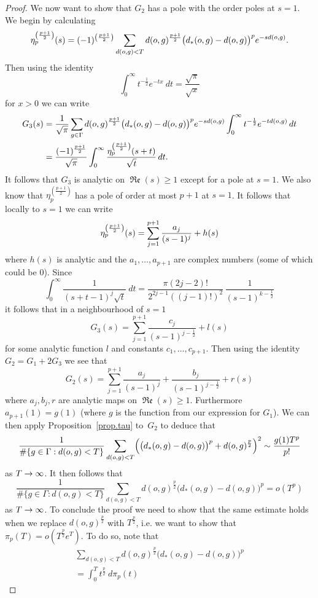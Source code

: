 \documentclass[10pt]{amsart}
\theoremstyle{definition}\newtheorem{defi}[theo]{Definition}\newtheorem{rema}[theo]{Remark}\newtheorem{exam}[theo]{Example}\newtheorem{exem}[theo]{Example}\newtheorem{nota}[theo]{Notation}
\newcommand{\G}{\Gamma}
\DeclareMathOperator{\fkRe}{\mathfrak{Re}}
\let\originalleft\left
\let\originalright\right
\renewcommand{\left}{\mathopen{}\mathclose\bgroup\originalleft}
\renewcommand{\right}{\aftergroup\egroup\originalright}
\renewcommand*{\to}{\mathchoice{\longrightarrow}{\rightarrow}{\rightarrow}{\rightarrow}}
\theoremstyle{plain}
\begin{document}
\begin{proof}
We now want to show that $G_2$ has a pole with the order poles at $s=1$. We begin by calculating
\[
\eta_p^{\left(\frac{p+1}{2}\right)}(s) = (-1)^{\left(\frac{p+1}{2}\right)} \sum_{d(o,g) <T} d(o,g)^{ \frac{p+1}{2}}\bigl(d_\ast(o,g) - d(o,g)\bigr)^p e^{-sd(o,g)}.
\]
Then using the identity
\[
\int_0^\infty t^{-\frac{1}{2}} e^{-tx} \ dt = \frac{\sqrt{\pi}}{\sqrt{x}}
\]
for $x >0$ we can write
\begin{align*}
G_3(s) &= \frac{1}{\sqrt{\pi}} \sum_{g\in\G} d(o,g)^{\frac{p+1}{2}} \bigl(d_\ast(o,g) - d(o,g)\bigr)^p e^{-sd(o,g)} \int_0^\infty t^{-\frac{1}{2}} e^{-td(o,g)} \, dt\\
&= \frac{(-1)^{\frac{p+1}{2}}}{\sqrt{\pi}} \int_0^\infty \frac{\eta_p^{\left(\frac{p+1}{2}\right)}(s+t) }{\sqrt{t}} \, dt.
\end{align*}
It follows that $G_3$ is analytic on $\fkRe(s) \ge 1$ except for a pole at $s=1$. We also know that $\eta_p^{(\frac{p+1}{2})}$ has a pole of order at most $p+1$ at $s=1$. It follows that locally to $s=1$ we can write
\[
\eta_p^{\left(\frac{p+1}{2}\right)}(s) = \sum_{j=1}^{p+1} \frac{a_j}{(s-1)^j} + h(s)
\]
where $h(s)$ is analytic and the $a_1,\dots, a_{p+1}$ are complex numbers (some of which could be $0$). Since
\[
\int_0^\infty \frac{1}{(s+t -1)^j \sqrt{t}} \ dt = \frac{\pi (2j-2)!}{2^{2j-1}((j-1)!)^2} \, \frac{1}{(s-1)^{k-\frac{1}{2}}}
\]
it follows that in a neighbourhood of $s=1$
\[
G_3(s) = \sum_{j=1}^{p+1} \frac{c_j}{(s-1)^{j-\frac{1}{2}}} + l(s)
\]
for some analytic function $l$ and constants $c_1, \dots, c_{p+1}$. Then using the identity $G_2 = G_1 + 2G_3$ we see that
\[
G_2(s) = \sum_{j=1}^{p+1} \frac{a_j}{(s-1)^j} + \frac{b_j}{(s-1)^{j-\frac{1}{2}}} + r(s)
\]
where $a_j, b_j,r$ are analytic maps on $\fkRe(s) \ge 1$. Furthermore $a_{p+1}(1) = g(1)$ (where $g$ is the function from our expression for $G_1$). We can then apply Proposition~\ref{prop.tau} to~$G_2$ to deduce that
\[
\frac{1}{\#\{g\in\G: d(o,g) <T\}} \sum_{d(o,g) < T} \left(\bigl(d_\ast(o,g) - d(o,g)\bigr)^p + d(o,g)^{\frac{p}{2}} \right)^2 \sim \frac{g(1)T^{p}}{p!}
\]
as $T \to\infty$. It then follows that
\[
\frac{1}{\#\{g\in\G:d(o,g) <T\}}\sum_{d(o,g) < T} d(o,g)^{\frac{p}{2}} \bigl(d_\ast(o,g) - d(o,g)\bigr)^p = o(T^p)
\]
as $T\to\infty$. To conclude the proof we need to show that the same estimate holds when we replace $d(o,g)^{\frac{p}{2}}$ with $T^{\frac{p}{2}}$, i.e. we want to show that $\pi_p(T) = o(T^{\frac{p}{2}} e^T)$. To do so, note that
\begin{multline}\label{eq.pi}
\sum_{d(o,g) < T} d(o,g)^{\frac{p}{2}} \bigl(d_\ast(o,g) - d(o,g)\bigr)^p \\= \int_0^T t^{\frac{p}{2}} \ d\pi_p(t)

\end{multline}
\end{proof}
\end{document}
